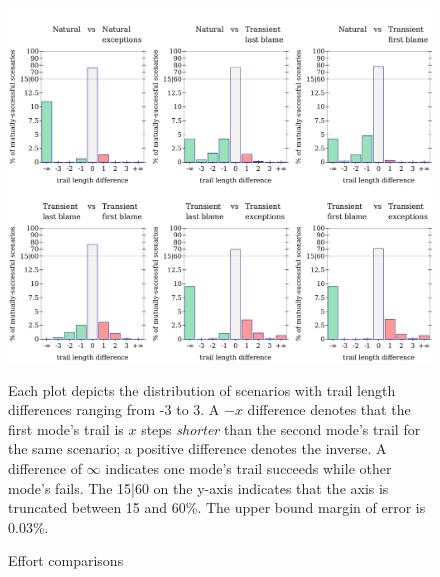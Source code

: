 \begin{figure}\footnotesize \centering
  \includegraphics[width=\textwidth]{./plots/bt-length-comparisons}

  \vspace{1em}
  \begin{minipage}{0.95\textwidth}

    Each plot depicts the distribution of scenarios with trail length
    differences ranging from -3 to 3. A $-x$ difference denotes that the first
    mode's trail is $x$ steps {\em shorter\/} than the second mode's trail for the
    same scenario; a positive difference denotes the inverse. A difference of
    $\infty$ indicates one mode's trail succeeds while other mode's fails. The
    15|60 on the y-axis indicates that the axis is truncated between 15 and
    60\%.
    The upper bound margin of error is 0.03\%.

  \end{minipage}

  \caption{Effort comparisons} \label{fig:effort-comparisons}
\end{figure}

